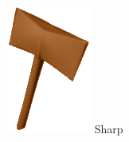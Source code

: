 \begin{frame}
\begin{columns}
\begin{column}[b]{0.22\textwidth}
\begin{center}
				\includegraphics[width=\textwidth]{./img/2_mesh/sharpAxeShaded.png}
				\small{Sharp}
			\end{center}	
		\end{column}
	\end{columns}
\end{frame}	
